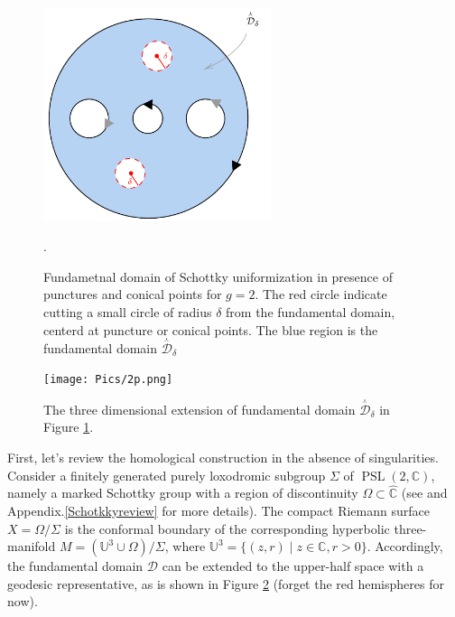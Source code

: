 \documentclass[a4paper,11pt]{article}
\newcommand{\PSLC}{\operatorname{PSL}(2,\mathbb{C})}
\newcommand{\SchottkyFund}{\mathcal{D}}
\newcommand{\singfund}{\overset{{}_{\curlywedge}}{\mathcal{D}}}
\begin{document}
\begin{figure}[h]
	\centering
	\includegraphics[width=18em]{Pics/1.png}
	\caption{Fundametnal domain of Schottky uniformization in presence of punctures and conical points for $g=2$. The red circle indicate cutting a small circle of radius $\delta$ from the fundamental domain, centerd at puncture or conical points. The blue region is the fundamental domain $\singfund_{\delta}$}.
	\label{fig:1}
\end{figure}


\begin{figure}[h]
\centering
\texttt{[image: Pics/2p.png]}
\caption{The three dimensional extension of fundamental domain $\singfund_{\delta}$ in Figure \ref{fig:1}.}
\label{fig:2}
\end{figure}

First, let's review the  homological construction in the absence of singularities. Consider a finitely generated purely loxodromic subgroup $\Sigma$ of $\PSLC$, namely a marked  Schottky group with a region of discontinuity $\Omega \subset\hat{\mathbb{C}}$ (see \cite{zograf1988uniformization,Taghavi2024classical} and Appendix.\ref{Schotkkyreview} for more details). The compact Riemann surface $X =\Omega\slash \Sigma$ is the conformal boundary of the corresponding hyperbolic three-manifold  $M = (\mathbb{U}^3\cup \Omega)\slash\Sigma$, where $\mathbb{U}^3 = \{(z,r) \; | \; z\in \mathbb{C}, r>0
\}$. Accordingly, the fundamental domain $\SchottkyFund$ can be extended to the upper-half space with a geodesic representative, as is shown in Figure \ref{fig:2} (forget the red hemispheres for now).
\end{document}
